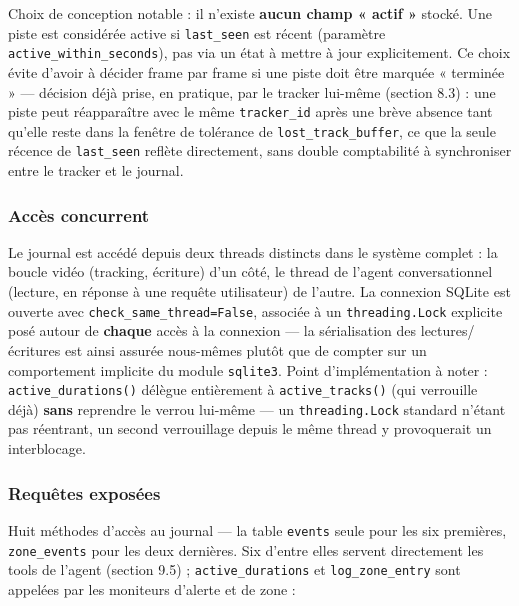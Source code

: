 \documentclass[11pt,a4paper]{article}
\let\Oldsubsubsection\subsubsection
\renewcommand{\subsubsection}{\FloatBarrier\Oldsubsubsection}
\begin{document}
    Choix de conception notable : il n'existe \textbf{aucun champ
    « actif »} stocké. Une piste est considérée active si
    \texttt{last\_seen} est récent (paramètre
    \texttt{active\_within\_seconds}), pas via un état à mettre à jour
    explicitement. Ce choix évite d'avoir à décider frame par frame si une
    piste doit être marquée « terminée » --- décision déjà prise, en
    pratique, par le tracker lui-même (section 8.3) : une piste peut
    réapparaître avec le même \texttt{tracker\_id} après une brève absence
    tant qu'elle reste dans la fenêtre de tolérance de
    \texttt{lost\_track\_buffer}, ce que la seule récence de
    \texttt{last\_seen} reflète directement, sans double comptabilité à
    synchroniser entre le tracker et le journal.
    
    \subsubsection{Accès concurrent}
    
    Le journal est accédé depuis deux threads distincts dans le système
    complet : la boucle vidéo (tracking, écriture) d'un côté, le thread de
    l'agent conversationnel (lecture, en réponse à une requête utilisateur)
    de l'autre. La connexion SQLite est ouverte avec
    \texttt{check\_same\_thread=False}, associée à un
    \texttt{threading.Lock} explicite posé autour de \textbf{chaque} accès
    à la connexion --- la sérialisation des lectures/écritures est ainsi
    assurée nous-mêmes plutôt que de compter sur un comportement implicite
    du module \texttt{sqlite3}. Point d'implémentation à noter :
    \texttt{active\_durations()} délègue entièrement à
    \texttt{active\_tracks()} (qui verrouille déjà) \textbf{sans} reprendre
    le verrou lui-même --- un \texttt{threading.Lock} standard n'étant pas
    réentrant, un second verrouillage depuis le même thread y
    provoquerait un interblocage.
    
    \subsubsection{Requêtes exposées}
    
    Huit méthodes d'accès au journal --- la table \texttt{events} seule
    pour les six premières, \texttt{zone\_events} pour les deux dernières.
    Six d'entre elles servent directement les tools de l'agent (section
    9.5) ; \texttt{active\_durations} et \texttt{log\_zone\_entry} sont
    appelées par les moniteurs d'alerte et de zone :
    
\end{document}
